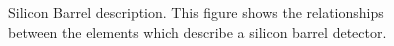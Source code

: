 \begin{figure} [htbp]
\centerline{\epsfxsize=5.0in }
\caption{\label{sib4} Silicon Barrel description. This figure shows
the relationships between the elements which describe a silicon
barrel detector.}
\end{figure}






